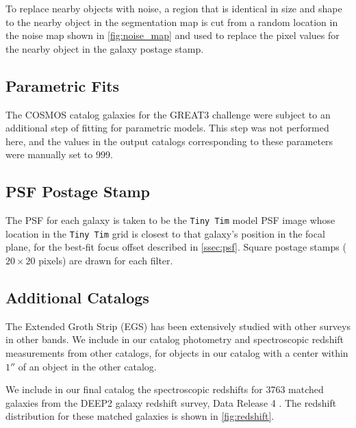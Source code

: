 \documentclass[a4paper,11pt]{article}
\begin{document}
To replace nearby objects with noise, a region that is identical in size and shape to the nearby object in the segmentation map is cut from a random location in the noise map shown in \autoref{fig:noise_map} and used to replace the pixel values for the nearby object in the galaxy postage stamp.  

\subsection{Parametric Fits}
The COSMOS catalog galaxies for the GREAT3 challenge were subject to an additional step of fitting for parametric models. This step was not performed here, and the values in the output catalogs corresponding to these parameters were manually set to 999.

\subsection{PSF Postage Stamp}
The PSF for each galaxy is taken to be the {\tt Tiny Tim} model PSF image whose location in the {\tt Tiny Tim} grid is closest to that galaxy's position in the focal plane, for the best-fit focus offset described in \autoref{ssec:psf}. Square postage stamps ($20 \times 20$ pixels) are drawn for each filter.

\subsection{Additional Catalogs}
The Extended Groth Strip (EGS) has been extensively studied with other surveys in other bands. 
We include in our catalog photometry and spectroscopic redshift measurements from other catalogs, for objects in our catalog with a center within $1''$ of an object in the other catalog.

We include in our final catalog the spectroscopic redshifts for 3763 matched galaxies from the DEEP2 galaxy redshift survey, Data Release 4 \citep{Newman2013}. 
The redshift distribution for these matched galaxies is shown in \autoref{fig:redshift}. 
\end{document}
